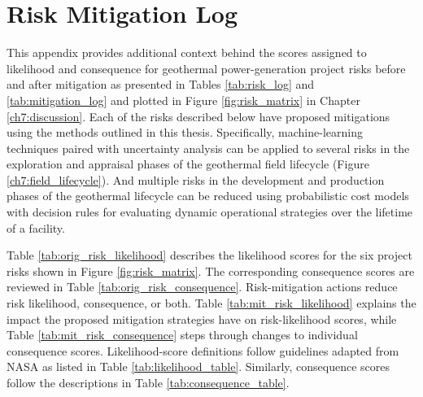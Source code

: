 \chapter{Risk Mitigation Log}\label{app:C_risk_log}

This appendix provides additional context behind the scores assigned to likelihood and consequence for geothermal power-generation project risks before and after mitigation as presented in Tables \ref{tab:risk_log} and \ref{tab:mitigation_log} and plotted in Figure \ref{fig:risk_matrix} in Chapter \ref{ch7:discussion}. Each of the risks described below have proposed mitigations using the methods outlined in this thesis. Specifically, machine-learning techniques paired with uncertainty analysis can be applied to several risks in the exploration and appraisal phases of the geothermal field lifecycle (Figure \ref{ch7:field_lifecycle}). And multiple risks in the development and production phases of the geothermal lifecycle can be reduced using probabilistic cost models with decision rules for evaluating dynamic operational strategies over the lifetime of a facility.

Table \ref{tab:orig_risk_likelihood} describes the likelihood scores for the six project risks shown in Figure \ref{fig:risk_matrix}. The corresponding consequence scores are reviewed in Table \ref{tab:orig_risk_consequence}. Risk-mitigation actions reduce risk likelihood, consequence, or both. Table \ref{tab:mit_risk_likelihood} explains the impact the proposed mitigation strategies have on risk-likelihood scores, while Table \ref{tab:mit_risk_consequence} steps through changes to individual consequence scores. Likelihood-score definitions follow guidelines adapted from NASA as listed in Table \ref{tab:likelihood_table}. Similarly, consequence scores follow the descriptions in Table \ref{tab:consequence_table}.

